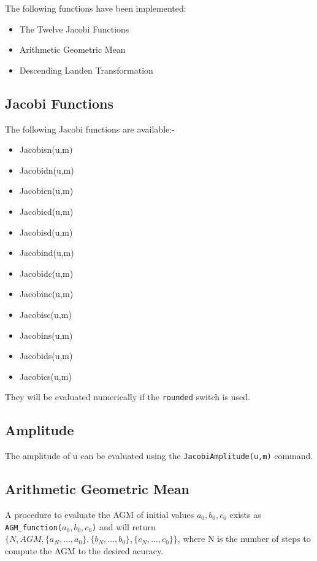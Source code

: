 \documentclass[11pt]{article}
\begin{document}
The following functions have been implemented:

\begin{itemize}
\item The Twelve Jacobi Functions
\item Arithmetic Geometric Mean
\item Descending Landen Transformation
\end{itemize}

\subsection{Jacobi Functions}

The following Jacobi functions are available:-

\begin{itemize}
\item Jacobisn(u,m)
\item Jacobidn(u,m)
\item Jacobicn(u,m)
\item Jacobicd(u,m)
\item Jacobisd(u,m)
\item Jacobind(u,m)
\item Jacobidc(u,m)
\item Jacobinc(u,m)
\item Jacobisc(u,m)
\item Jacobins(u,m)
\item Jacobids(u,m)
\item Jacobics(u,m)
\end{itemize}

They will be evaluated numerically if the {\tt rounded} switch is used.

\subsection{Amplitude}

The amplitude of u can be evaluated using the 
{\tt JacobiAmplitude(u,m)} command.

\subsection{Arithmetic Geometric Mean}

A procedure to evaluate the AGM of initial values \(a_0,b_0,c_0\) 
exists as \\
{\tt AGM\_function(\(a_0,b_0,c_0\))} and will return \\
$\{ N, AGM, \{ a_N, \ldots ,a_0\}, \{ b_N, \ldots ,b_0\}, 
\{c_N, \ldots ,c_0\}\}$, 
where N is the number of steps to compute the AGM to the 
desired acuracy. \\
\end{document}
